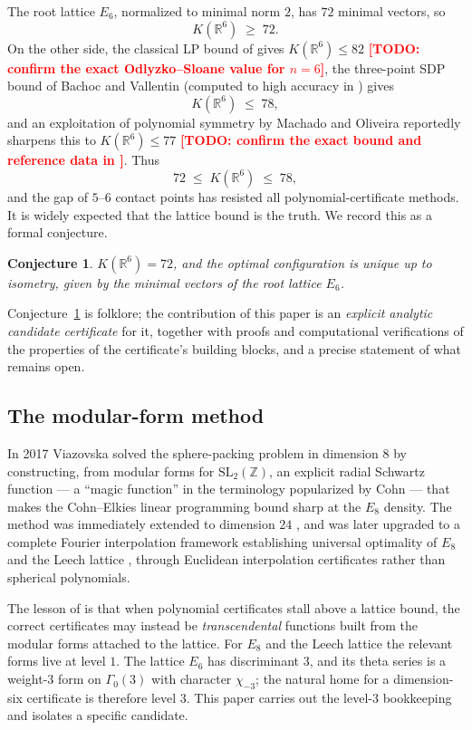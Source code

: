 \documentclass[11pt,reqno]{amsart}
\theoremstyle{plain}
\newtheorem{conjecture}[theorem]{Conjecture}
\theoremstyle{definition}
\theoremstyle{remark}
\newcommand{\R}{\mathbb{R}}
\newcommand{\Z}{\mathbb{Z}}
\newcommand{\TODO}[1]{\textcolor{red}{\textbf{[TODO: #1]}}}
\begin{document}
The root lattice $E_6$, normalized to minimal norm $2$, has $72$
minimal vectors, so
\[
K(\R^6)\;\ge\;72 .
\]
On the other side, the classical LP bound of \cite{OdlyzkoSloane1979}
gives $K(\R^6)\le 82$
\TODO{confirm the exact Odlyzko--Sloane value for $n=6$},
the three-point SDP bound of Bachoc and Vallentin
\cite{BachocVallentin2008} (computed to high accuracy in
\cite{MittelmannVallentin2010}) gives
\[
K(\R^6)\;\le\;78,
\]
and an exploitation of polynomial symmetry by Machado and Oliveira
\cite{MachadoOliveira2018} reportedly sharpens this to $K(\R^6)\le 77$
\TODO{confirm the exact bound and reference data in
\cite{MachadoOliveira2018}}.  Thus
\[
72\;\le\;K(\R^6)\;\le\;78,
\]
and the gap of $5$--$6$ contact points has resisted all
polynomial-certificate methods.  It is widely expected that the lattice
bound is the truth.  We record this as a formal conjecture.

\begin{conjecture}\label{conj:main}
$K(\R^6)=72$, and the optimal configuration is unique up to isometry,
given by the minimal vectors of the root lattice $E_6$.
\end{conjecture}

Conjecture~\ref{conj:main} is folklore; the contribution of this paper
is an \emph{explicit analytic candidate certificate} for it, together
with proofs and computational verifications of the properties of the
certificate's building blocks, and a precise statement of what remains
open.

\subsection{The modular-form method}

In 2017 Viazovska \cite{Viazovska2017} solved the sphere-packing
problem in dimension $8$ by constructing, from modular forms for
$\mathrm{SL}_2(\Z)$, an explicit radial Schwartz function --- a
``magic function'' in the terminology popularized by Cohn
\cite{Cohn2017} --- that makes the Cohn--Elkies linear programming
bound \cite{CohnElkies2003} sharp at the $E_8$ density.  The method
was immediately extended to dimension $24$
\cite{CKMRV2017}, and was later upgraded to a complete Fourier
interpolation framework establishing universal optimality of $E_8$ and
the Leech lattice \cite{CKMRV2022}, through Euclidean interpolation
certificates rather than spherical polynomials.

The lesson of \cite{Viazovska2017,CKMRV2017,CKMRV2022} is that when
polynomial certificates stall above a lattice bound, the correct
certificates may instead be \emph{transcendental} functions built from
the modular forms attached to the lattice.  For $E_8$ and the Leech
lattice the relevant forms live at level $1$.  The lattice $E_6$ has
discriminant $3$, and its theta series is a weight-$3$ form on
$\Gamma_0(3)$ with character $\chi_{-3}$; the natural home for a
dimension-six certificate is therefore level $3$.  This paper carries
out the level-$3$ bookkeeping and isolates a specific candidate.
\end{document}
